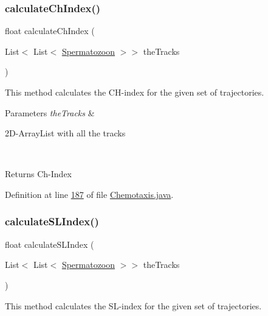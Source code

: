 \subsubsection{\texorpdfstring{calculate\+Ch\+Index()}{calculateChIndex()}}
{\footnotesize\ttfamily float calculate\+Ch\+Index (\begin{DoxyParamCaption}\item[{List$<$ List$<$ \hyperlink{classdata_1_1_spermatozoon}{Spermatozoon} $>$$>$}]{the\+Tracks }\end{DoxyParamCaption})\hspace{0.3cm}{\ttfamily [private]}}

This method calculates the C\+H-\/index for the given set of trajectories.


\begin{DoxyParams}{Parameters}
{\em the\+Tracks} & 
\begin{DoxyItemize}
\item 2\+D-\/\+Array\+List with all the tracks 
\end{DoxyItemize}\\
\hline
\end{DoxyParams}
\begin{DoxyReturn}{Returns}
Ch-\/\+Index 
\end{DoxyReturn}


Definition at line \hyperlink{_chemotaxis_8java_source_l00187}{187} of file \hyperlink{_chemotaxis_8java_source}{Chemotaxis.\+java}.

\hypertarget{classanalysis_1_1_chemotaxis_ae3ff70acea28007b345ce335321b82fe}{}\label{classanalysis_1_1_chemotaxis_ae3ff70acea28007b345ce335321b82fe} 
\subsubsection{\texorpdfstring{calculate\+S\+L\+Index()}{calculateSLIndex()}}
{\footnotesize\ttfamily float calculate\+S\+L\+Index (\begin{DoxyParamCaption}\item[{List$<$ List$<$ \hyperlink{classdata_1_1_spermatozoon}{Spermatozoon} $>$$>$}]{the\+Tracks }\end{DoxyParamCaption})\hspace{0.3cm}{\ttfamily [private]}}

This method calculates the S\+L-\/index for the given set of trajectories.


